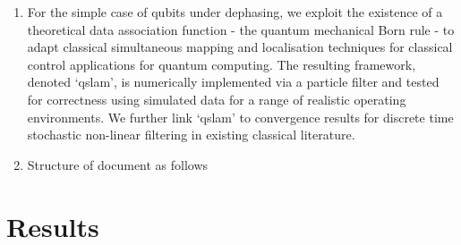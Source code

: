 \begin{enumerate}
	\item For the simple case of qubits under dephasing, we exploit the existence of a theoretical data association function - the quantum mechanical Born rule - to adapt classical simultaneous mapping and localisation techniques for classical control applications for quantum computing. The resulting framework, denoted `qslam', is numerically implemented via a particle filter and tested for correctness using simulated data for a range of realistic operating environments. We further link `qslam' to convergence results for discrete time stochastic non-linear filtering in existing classical literature.  
	\item Structure of document as follows
\end{enumerate}
\fi


\section{Results}


